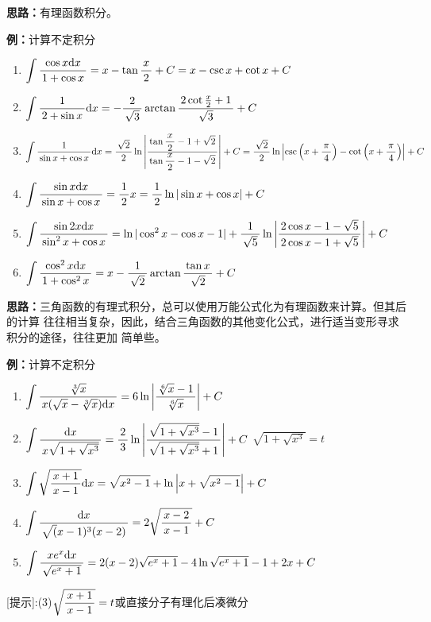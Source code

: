 \begin{shaded}
{\bf 思路：}有理函数积分。
\end{shaded}

{\bf 例：}计算不定积分
\begin{enumerate}[(1)]
  \setlength{\itemindent}{1cm}
  \item $\dint\df{\cos x\d x}{1+\cos x}=x-\tan\df x2+C=x-\csc x+\cot x+C$
  \item $\dint\df1{2+\sin x}\d x=-\df2{\sqrt3}\arctan\df{2\cot\frac 
  x2+1}{\sqrt 3}+C$
  \item $\dint\df1{\sin x+\cos x}\d x=\df{\sqrt 2}{2}\ln\left|
  \df{\tan\df x2-1+\sqrt 2}{\tan\df x2-1-\sqrt 2}\right|+C
  =\df{\sqrt2}2\ln\left|\csc\left(x+\df{\pi}4\right)
  -\cot\left(x+\df{\pi}4\right)\right|+C$
  \item $\dint\df{\sin x\d x}{\sin x+\cos x}=\df12x=\df12
  \ln|\sin x+\cos x|+C$
  \item $\dint\df{\sin2x\d x}{\sin^2x+\cos x}=
  \ln|\cos^2x-\cos x-1|+\df1{\sqrt5}\ln\left|
  \df{2\cos x-1-\sqrt5}{2\cos x-1+\sqrt 5}\right|+C$
  \item $\dint\df{\cos^2x\d x}{1+\cos^2x}=x-\df1{\sqrt2}\arctan
  \df{\tan x}{\sqrt 2}+C$
\end{enumerate}

\begin{shaded}
{\bf 思路：}三角函数的有理式积分，总可以使用万能公式化为有理函数来计算。但其后的计算
往往相当复杂，因此，结合三角函数的其他变化公式，进行适当变形寻求积分的途径，往往更加
简单些。
\end{shaded}

{\bf 例：}计算不定积分
\begin{enumerate}[(1)]
  \setlength{\itemindent}{1cm}
  \item $\dint\df{\sqrt[3]x}{x(\sqrt x-\sqrt[3]x)\d x}=6\ln\left|
  \df{\sqrt[6]x-1}{\sqrt[6]x}\right|+C$
  \item $\dint\df{\d x}{x\sqrt{1+\sqrt{x^3}}}=\df23\ln\left|
  \df{\sqrt{1+\sqrt{x^3}}-1}{\sqrt{1+\sqrt{x^3}}+1}\right|+C$
  \hfill$\sqrt{1+\sqrt{x^3}}=t$
  \item $\dint\sqrt{\df{x+1}{x-1}}\d x=\sqrt{x^2-1}+\ln\left|
  x+\sqrt{x^2-1}\right|+C$
  \item $\dint\df{\d x}{\sqrt(x-1)^3(x-2)}=2\sqrt{\df{x-2}{x-1}}+C$
  \item $\dint\df{xe^x\d x}{\sqrt{e^x+1}}=2(x-2)\sqrt{e^x+1}
  -4\ln{\sqrt{e^x+1}-1}+2x+C$
\end{enumerate}

[提示]:(3)$\sqrt{\df{x+1}{x-1}}=t$或直接分子有理化后凑微分

